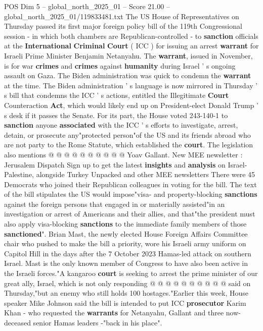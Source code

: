 \begin{textsample}{POS Dim 5 – global\_north\_2025\_01 – Score 21.00 – global\_north\_2025\_01/119833481.txt}  \label{ex:f5_pos_261}
The US House of Representatives on Thursday passed its first major foreign policy bill of the 119th Congressional session - in which both chambers are Republican-controlled - to \textbf{sanction} officials at the \textbf{International} \textbf{Criminal} \textbf{Court} ( ICC ) for issuing an arrest \textbf{warrant} for Israeli Prime Minister Benjamin Netanyahu.
The \textbf{warrant}, issued in November, is for war \textbf{crimes} and \textbf{crimes} against \textbf{humanity} during Israel ' s ongoing assault on Gaza.
The Biden administration was quick to condemn the \textbf{warrant} at the time.
The Biden administration ' s language is now mirrored in Thursday ' s bill that condemns the ICC ' s actions, entitled the Illegitimate \textbf{Court} Counteraction \textbf{Act}, which would likely end up on President-elect Donald Trump ' s desk if it passes the Senate.
For its part, the House voted 243-140-1 to \textbf{sanction} anyone \textbf{associated} with the ICC ' s efforts to investigate, arrest, detain, or prosecute any"protected person"of the US and its friends abroad who are not party to the Rome Statute, which established the \textbf{court}.
The legislation also mentions @ @ @ @ @ @ @ @ @ @ Yoav Gallant.
New MEE newsletter : Jerusalem Dispatch Sign up to get the latest \textbf{insights} and \textbf{analysis} on Israel-Palestine, alongside Turkey Unpacked and other MEE newsletters There were 45 Democrats who joined their Republican colleagues in voting for the bill.
The text of the bill stipulates the US would impose"visa- and property-blocking \textbf{sanctions} against the foreign persons that engaged in or materially assisted"in an investigation or arrest of Americans and their allies, and that"the president must also apply visa-blocking \textbf{sanctions} to the immediate family members of those \textbf{sanctioned}".
Brian Mast, the newly elected House Foreign Affairs Committee chair who pushed to make the bill a priority, wore his Israeli army uniform on Capitol Hill in the days after the 7 October 2023 Hamas-led attack on southern Israel.
Mast is the only known member of Congress to have also been active in the Israeli forces."A kangaroo \textbf{court} is seeking to arrest the prime minister of our great ally, Israel, which is not only responding @ @ @ @ @ @ @ @ @ @ said on Thursday,"but an enemy who still holds 100 hostages."Earlier this week, House speaker Mike Johnson said the bill is intended to put ICC \textbf{prosecutor} Karim Khan - who requested the \textbf{warrants} for Netanyahu, Gallant and three now-deceased senior Hamas leaders -"back in his place".

\end{textsample}
